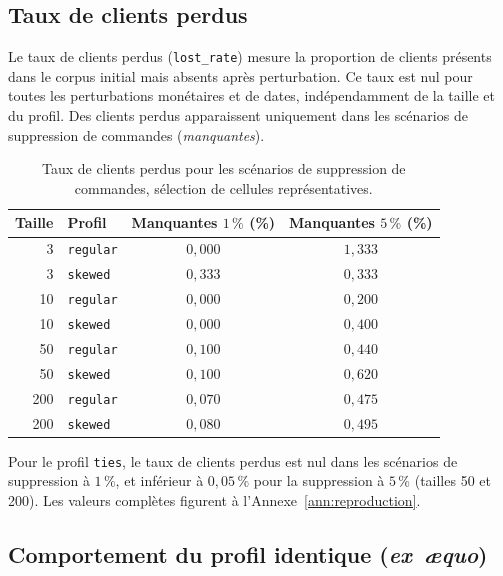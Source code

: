 \subsection{Taux de clients perdus}
\label{subsec:resultats-perdus}

Le taux de clients perdus (\texttt{lost\_rate}) mesure la proportion de clients présents
dans le corpus initial mais absents après perturbation. Ce taux est nul pour toutes les
perturbations monétaires et de dates, indépendamment de la taille et du profil. Des clients
perdus apparaissent uniquement dans les scénarios de suppression de commandes (\emph{manquantes}).

\begin{table}[htb]
  \centering
  \caption{Taux de clients perdus pour les scénarios de suppression de commandes,
    sélection de cellules représentatives.}
  \label{tab:resultats-perdus}
  \begin{tabular}{rlcc}
    \toprule
    Taille & Profil & Manquantes $1\,\%$ (\%) & Manquantes $5\,\%$ (\%) \\
    \midrule
    3   & \texttt{regular}  & $0{,}000$ & $1{,}333$ \\
    3   & \texttt{skewed}   & $0{,}333$ & $0{,}333$ \\
    10  & \texttt{regular}  & $0{,}000$ & $0{,}200$ \\
    10  & \texttt{skewed}   & $0{,}000$ & $0{,}400$ \\
    50  & \texttt{regular}  & $0{,}100$ & $0{,}440$ \\
    50  & \texttt{skewed}   & $0{,}100$ & $0{,}620$ \\
    200 & \texttt{regular}  & $0{,}070$ & $0{,}475$ \\
    200 & \texttt{skewed}   & $0{,}080$ & $0{,}495$ \\
    \bottomrule
  \end{tabular}
\end{table}

Pour le profil \texttt{ties}, le taux de clients perdus est nul dans les scénarios de
suppression à $1\,\%$, et inférieur à $0{,}05\,\%$ pour la suppression à $5\,\%$ (tailles
50 et 200). Les valeurs complètes figurent à l'Annexe~\ref{ann:reproduction}.

\subsection{Comportement du profil identique (\emph{ex~æquo})}
\label{subsec:resultats-ties}

